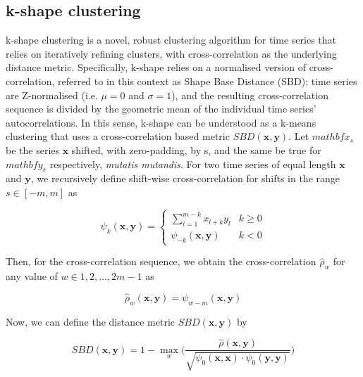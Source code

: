 \documentclass{article}
\begin{document}

\subsection{k-shape clustering} %
\label{sub:k_shape_clustering}

k-shape clustering is a novel, robust clustering algorithm for time series that relies on iteratively refining clusters, with cross-correlation as the underlying distance metric.\cite{paparrizos2015k} Specifically, k-shape relies on a normalised version of cross-correlation, referred to in this context as Shape Base Distance (SBD): time series are Z-normalised (i.e. $\mu = 0$ and $\sigma = 1$), and the resulting cross-correlation sequence is divided by the geometric mean of the individual time series' autocorrelations. In this sense, k-shape can be understood as a k-means clustering that uses a cross-correlation based metric $SBD(\mathbf{x}, \mathbf{y})$. Let $mathbf{x}_s$ be the series $\mathbf{x}$ shifted, with zero-padding, by s, and the same be true for $mathbf{y}_s$ respectively, \emph{mutatis mutandis}. For two time series of equal length $\mathbf{x}$ and $\mathbf{y}$, we recursively define shift-wise cross-correlation for shifts in the range $s \in [-m, m]$ as

\begin{equation}
	\psi_{k} (\mathbf{x}, \mathbf{y}) = 
	\begin{cases}
		\displaystyle \sum_{l = 1}^{m - k} x_{l + k} y_l 		& k \geq 0 \\
		\psi_{-k} (\mathbf{x}, \mathbf{y})						& k < 0 
	\end{cases}
\end{equation}

Then, for the cross-correlation sequence, we obtain the cross-correlation $\hat{\rho}_w$ for any value of $w \in {1, 2, \ldots, 2m - 1}$ as

\begin{equation}
	\hat{\rho}_w (\mathbf{x}, \mathbf{y}) = \psi_{w - m} (\mathbf{x}, \mathbf{y})
\end{equation}

Now, we can define the distance metric $SBD(\mathbf{x}, \mathbf{y})$ by

\begin{equation}
	SBD(\mathbf{x}, \mathbf{y}) = 1 - \max_w \Bigg( \frac{\hat{\rho} (\mathbf{x}, \mathbf{y})}{\sqrt{\psi_0(\mathbf{x}, \mathbf{x}) \cdot \psi_0(\mathbf{y}, \mathbf{y})}} \Bigg)
\end{equation}
\end{document}

